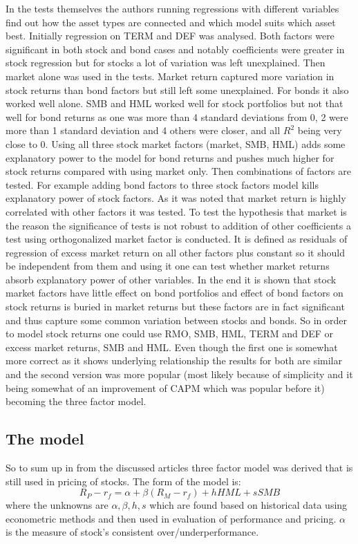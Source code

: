 \documentclass[a4paper,12pt]{article} %
\begin{document}
	In the tests themselves the authors running regressions with different variables find out how the asset types are connected and which model suits which asset best. Initially regression on TERM and DEF was analysed. Both factors were significant in both stock and bond cases and notably coefficients were greater in stock regression but for stocks a lot of variation was left unexplained. Then market alone was used in the tests. Market return captured more variation in stock returns than bond factors but still left some unexplained. For bonds it also worked well alone. SMB and HML worked well for stock portfolios but not that well for bond returns as one was more than 4 standard deviations from 0, 2 were more than 1 standard deviation and 4 others were closer, and all $R^2$ being very close to 0. Using all three stock market factors (market, SMB, HML) adds some explanatory power to the model for bond returns and pushes much higher for stock returns compared with using market only.
	Then combinations of factors are tested. For example adding bond factors to three stock factors model kills explanatory power of stock factors. As it was noted that market return is highly correlated with other factors it was tested. To test the hypothesis that market is the reason the significance of tests is not robust to addition of other coefficients a test using orthogonalized market factor is conducted. It is defined as residuals of regression of excess market return on all other factors plus constant so it should be independent from them and using it one can test whether market returns absorb explanatory power of other variables. In the end it is shown that stock market factors have little effect on bond portfolios and effect of bond factors on stock returns is buried in market returns but these factors are in fact significant and thus capture some common variation between stocks and bonds. So in order to model stock returns one could use RMO, SMB, HML, TERM and DEF or excess market returns, SMB and HML. Even though the first one is somewhat more correct as it shows underlying relationship the results for both are similar and the second version was more popular (most likely because of simplicity and it being somewhat of an improvement of CAPM which was popular before it) becoming the three factor model.
	\subsection{The model}
	So to sum up in from the discussed articles three factor model was derived that is still used in pricing of stocks. The form of the model is:
	\[R_P - r_f = \alpha + \beta (R_M - r_f) + hHML + sSMB\]
	where the unknowns are $\alpha, \beta, h, s$ which are found based on historical data using econometric methods and then used in evaluation of performance and pricing. $\alpha$ is the measure of stock's consistent over/underperformance.
	\newpage
\end{document}
